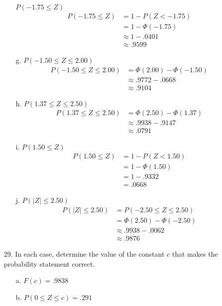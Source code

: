 \documentclass[letterpaper,12pt]{article}
\begin{document}
\begin{enumerate}
\begin{enumerate}
        $P(-1.75 \le Z)$
        \begin{align*}
          P(-1.75 \le Z) &= 1 - P(Z < -1.75) \\
          &= 1 - \Phi(-1.75) \\
          &\approx 1 - .0401 \\
          &\approx .9599
        \end{align*}
      \item[g.]
        $P(-1.50 \le Z \le 2.00)$
        \begin{align*}
          P(-1.50 \le Z \le 2.00) &= \Phi(2.00) - \Phi(-1.50) \\
          &\approx .9772 - .0668 \\
          &\approx .9104
        \end{align*}
      \item[h.]
        $P(1.37 \le Z \le 2.50)$
        \begin{align*}
          P(1.37 \le Z \le 2.50) &= \Phi(2.50) - \Phi(1.37) \\
          &\approx .9938 - .9147 \\
          &\approx .0791
        \end{align*}
      \item[i.]
        $P(1.50 \le Z)$
        \begin{align*}
          P(1.50 \le Z) &= 1 - P(Z < 1.50) \\
          &= 1 - \Phi(1.50) \\
          &= 1 - .9332 \\
          &= .0668
        \end{align*}
      \item[j.]
        $P(|Z| \le 2.50)$
        \begin{align*}
          P(|Z| \le 2.50) &= P(-2.50 \le Z \le 2.50) \\
          &= \Phi(2.50) - \Phi(-2.50) \\
          &\approx .9938 - .0062 \\
          &\approx .9876
        \end{align*}
    \end{enumerate}
  \item[29.]
    In each case, determine the value of the constant $c$ that makes the probability statement correct.
    \begin{enumerate}
      \item[a.]
        $F(c) = .9838$
      \item[b.]
        $P(0 \le Z \le c) = .291$

\end{enumerate}
\end{enumerate}
\end{document}
